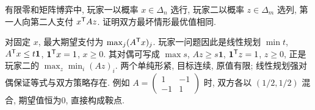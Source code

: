 \begin{example}
有限零和矩阵博弈中, 玩家一以概率 $x\in\Delta_n$ 选行, 玩家二以概率 $z\in\Delta_m$ 选列, 第一人向第二人支付 $x^{\mathsf T} Az$. 证明双方最坏情形最优值相同.
\end{example}
\begin{solution}
对固定 $x$, 最大期望支付为 $\max_j(A^{\mathsf T} x)_j$. 玩家一问题因此是线性规划 $\min t$, $A^{\mathsf T} x\le t\mathbf1$, $\mathbf1^{\mathsf T} x=1$, $x\ge0$. 其对偶可写成 $\max s$, $Az\ge s\mathbf1$, $\mathbf1^{\mathsf T} z=1$, $z\ge0$, 正是玩家二的 $\max_z\min_i(Az)_i$. 两个单纯形紧, 目标连续, 原值有限; 线性规划强对偶保证等式与双方策略存在. 例如 $A=\left(\begin{smallmatrix}1&-1\\-1&1\end{smallmatrix}\right)$ 时, 双方各以 $(1/2,1/2)$ 混合, 期望值恒为0, 直接构成鞍点.
\end{solution}
